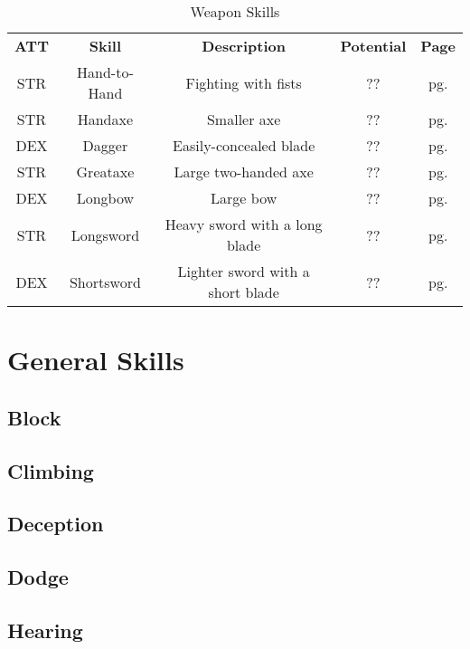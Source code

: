 \begin{table}[h!]
    \begin{tabular}{c c c c c}
        \bfseries{ATT} & \bfseries{Skill} & \bfseries{Description} & \bfseries{Potential} & \bfseries{Page} \\
        STR & Hand-to-Hand & Fighting with fists & ?? & pg. \pageref{skill:hand-to-hand} \\
        STR & Handaxe & Smaller axe & ?? & pg. \pageref{skill:handaxe} \\
        DEX & Dagger & Easily-concealed blade & ?? & pg. \pageref{skill:dagger} \\
        STR & Greataxe & Large two-handed axe & ?? & pg. \pageref{skill:greataxe} \\
        DEX & Longbow & Large bow & ?? & pg. \pageref{skill:longbow} \\
        STR & Longsword & Heavy sword with a long blade & ?? & pg. \pageref{skill:longsword} \\
        DEX & Shortsword & Lighter sword with a short blade & ?? & pg. \pageref{skill:shortsword} \\
    \end{tabular}
    \label{tab:weapon-skills}
    \caption{Weapon Skills}
\end{table}

\section{General Skills}

\subsection{Block}\label{skill:block}

\subsection{Climbing}\label{skill:climbing}

\subsection{Deception}\label{skill:deception}

\subsection{Dodge}\label{skill:dodge}

\subsection{Hearing}\label{skill:hearing}

